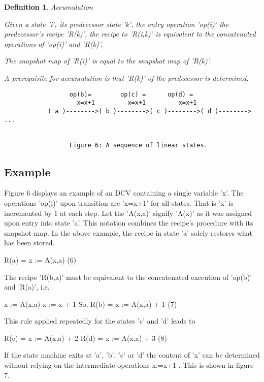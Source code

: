 \documentclass[12pt]{article}
\newtheorem{definition}{Definition}
\begin{document}
\begin{definition}
Accumulation

Given a state 'i', its predecessor state 'k', the entry operation 'op(i)'
the predecessor's recipe 'R(k)', the recipe to 'R(i,k)' is equivalent
to the concatenated operations of 'op(i)' and 'R(k)'.

The snapshot map of 'R(i)' is equal to the snapshot map of 'R(k)'.

A prerequisite for accumulation is that 'R(k)' of the predecessor is 
determined.
\end{definition}

\begin{verbatim}
                  op(b)=        op(c) =      op(d) =
                    x=x+1         x=x+1         x=x+1        
            ( a )-------->( b )-------->( c )-------->( d )--------> ...


                  Figure 6: A sequence of linear states.
\end{verbatim}

\subsection{Example}

Figure 6 displays an example of an DCV containing a single variable 'x'. The
operations 'op(i)' upon transition are 'x=x+1' for all states. That is 'x' is
incremented by 1 at each step. Let the 'A(x,a)' signify 'A(x)' as it was
assigned upon entry into state 'a'. This notation combines the recipe's
procedure with its snapshot map. In the above example, the recipe in state 'a'
solely restores what has been stored.

               R(a) = { x := A(x,a) }                                     (6)

The recipe 'R(b,a)' must be equivalent to the concatenated execution of 'op(b)'
and 'R(a)', i.e.

                   { x := A(x,a) }
                   { x := x + 1 }
So, 
               R(b) = { x := A(x,a) + 1 }                                 (7)

This rule applied repeatedly for the states 'c' and 'd' leads to

               R(c) = { x := A(x,a) + 2 }
               R(d) = { x := A(x,a) + 3 }                                 (8)

If the state machine exits at 'a', 'b', 'c' or 'd' the content of 'x' can be
determined without relying on the intermediate operations { x:=x+1 }. This
is shown in figure 7.
 
\end{document}
